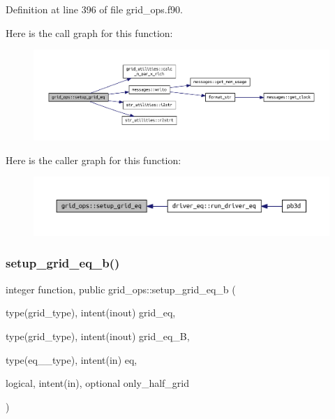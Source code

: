 Definition at line 396 of file grid\+\_\+ops.\+f90.

Here is the call graph for this function\+:
\nopagebreak
\begin{figure}[H]
\begin{center}
\leavevmode
\includegraphics[width=350pt]{namespacegrid__ops_ab749b0904ed8c69253fe8908c2624bcd_cgraph}
\end{center}
\end{figure}
Here is the caller graph for this function\+:
\nopagebreak
\begin{figure}[H]
\begin{center}
\leavevmode
\includegraphics[width=350pt]{namespacegrid__ops_ab749b0904ed8c69253fe8908c2624bcd_icgraph}
\end{center}
\end{figure}
\mbox{\label{namespacegrid__ops_ad16495ddd320562451c2325bafecf2d8}} 
\subsubsection{\texorpdfstring{setup\+\_\+grid\+\_\+eq\+\_\+b()}{setup\_grid\_eq\_b()}}
{\footnotesize\ttfamily integer function, public grid\+\_\+ops\+::setup\+\_\+grid\+\_\+eq\+\_\+b (\begin{DoxyParamCaption}\item[{type(grid\+\_\+type), intent(inout)}]{grid\+\_\+eq,  }\item[{type(grid\+\_\+type), intent(inout)}]{grid\+\_\+eq\+\_\+B,  }\item[{type(eq\+\_\+1\+\_\+type), intent(in)}]{eq,  }\item[{logical, intent(in), optional}]{only\+\_\+half\+\_\+grid }\end{DoxyParamCaption})}



